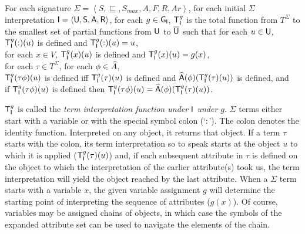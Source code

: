 \documentclass[output=paper
                ,modfonts
                ,nonflat
	        ,collection
	        ,collectionchapter
	        ,collectiontoclongg
 	        ,biblatex
                ,babelshorthands
                ,newtxmath
                ,draftmode
                ,colorlinks, citecolor=brown
]{./langsci/langscibook}
\begin{document}
{{\begin{mydef}
For each signature $\Sigma=\left<S,\sqsubseteq,S_{max},A,F,R,Ar\right>$,
for each initial $\Sigma$ interpretation $\mathsf{I}=\langle\mathsf{U},\mathsf{S},\mathsf{A},\mathsf{R}\rangle$,
for each $g\in\mathsf{G}_{\mathsf{I}}$,
$\mathsf{T}^{g}_{\mathsf{I}}$ is the total function from $T^{\Sigma}$ to the smallest
set of partial functions from $\mathsf{U}$ to $\overline{\mathsf{U}}$ such that
for each $u\in\mathsf{U}$,\\
\hspace*{.5cm} $\mathsf{T}^{g}_{\mathsf{I}}(\operatorname{:})(u)$ is defined and
$\mathsf{T}^{g}_{\mathsf{I}}(\operatorname{:})(u)=u$,\\
\hspace*{.5cm}for each $x\in V$, $\mathsf{T}^{g}_{\mathsf{I}}(x)(u)$ is defined and
$\mathsf{T}^{g}_{\mathsf{I}}(x)(u)=g(x)$,\\
\hspace*{.5cm}for each $\tau\in T^{\Sigma}$, for each $\phi\in\widehat{A}$,\\
\hspace*{1cm}$\mathsf{T}^{g}_{\mathsf{I}}(\tau\phi)(u)$ is defined %
             iff $\mathsf{T}^{g}_{\mathsf{I}}(\tau)(u)$ is defined and
             $\widehat{\mathsf{A}}(\phi)(\mathsf{T}^{g}_{\mathsf{I}}(\tau)(u))$ is defined, and\\
\hspace*{1cm}if $\mathsf{T}^{g}_{\mathsf{I}}(\tau\phi)(u)$ is defined then
             $\mathsf{T}^{g}_{\mathsf{I}}(\tau\phi)(u)=\widehat{\mathsf{A}}(\phi)(\mathsf{T}^{g}_{\mathsf{I}}(\tau)(u))$.
\end{mydef}
$\mathsf{T}^{g}_{\mathsf{I}}$ is called the \emph{term interpretation function
  under $\mathsf{I}$ under $g$}. $\Sigma$ terms either start with a
variable or with the special symbol colon (`$\operatorname{:}$'). The colon
denotes the identity function. Interpreted on any object, it returns
that object.  If a term $\tau$ starts with the colon, its term
interpretation so to speak starts at the object $u$ to which it is
applied ($\mathsf{T}^{g}_{\mathsf{I}}(\tau)(u)$) and, if each subsequent
attribute in $\tau$ is defined on the object to which the
interpretation of the earlier attribute(s) took us, the term
interpretation will yield the object reached by the last
attribute. When a $\Sigma$ term starts with a variable $x$, the given
variable assignment $g$ will determine the starting point of
interpreting the sequence of attributes ($g(x)$).  Of course,
variables may be assigned chains of objects, in which case the symbols
of the expanded attribute set can be used to navigate the elements of
the chain.

}}
\end{document}
